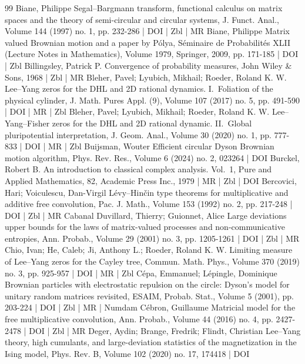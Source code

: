 \documentclass[10pt]{amsart}
\theoremstyle{definition}\newtheorem{defi}[theo]{Definition}\newtheorem{rema}[theo]{Remark}\newtheorem{exam}[theo]{Example}\newtheorem{exem}[theo]{Example}\newtheorem{nota}[theo]{Notation}
\begin{document}
\begin{thebibliography}{99}
Biane, Philippe Segal–Bargmann transform, functional calculus on matrix spaces and the theory of semi-circular and circular systems, J. Funct. Anal., Volume 144 (1997) no. 1, pp. 232-286 | DOI | Zbl | MR
Biane, Philippe Matrix valued Brownian motion and a paper by Pólya, Séminaire de Probabilités XLII (Lecture Notes in Mathematics), Volume 1979, Springer, 2009, pp. 171-185 | DOI | Zbl
Billingsley, Patrick P. Convergence of probability measures, John Wiley \& Sons, 1968 | Zbl | MR
Bleher, Pavel; Lyubich, Mikhail; Roeder, Roland K. W. Lee–Yang zeros for the DHL and 2D rational dynamics. I. Foliation of the physical cylinder, J. Math. Pures Appl. (9), Volume 107 (2017) no. 5, pp. 491-590 | DOI | MR | Zbl
Bleher, Pavel; Lyubich, Mikhail; Roeder, Roland K. W. Lee–Yang–Fisher zeros for the DHL and 2D rational dynamic. II. Global pluripotential interpretation, J. Geom. Anal., Volume 30 (2020) no. 1, pp. 777-833 | DOI | MR | Zbl
Buijsman, Wouter Efficient circular Dyson Brownian motion algorithm, Phys. Rev. Res., Volume 6 (2024) no. 2, 023264 | DOI
Burckel, Robert B. An introduction to classical complex analysis. Vol. 1, Pure and Applied Mathematics, 82, Academic Press Inc., 1979 | MR | Zbl | DOI
Bercovici, Hari; Voiculescu, Dan-Virgil Lévy–Hinčin type theorems for multiplicative and additive free convolution, Pac. J. Math., Volume 153 (1992) no. 2, pp. 217-248 | DOI | Zbl | MR
Cabanal Duvillard, Thierry; Guionnet, Alice Large deviations upper bounds for the laws of matrix-valued processes and non-communicative entropies, Ann. Probab., Volume 29 (2001) no. 3, pp. 1205-1261 | DOI | Zbl | MR
Chio, Ivan; He, Caleb; Ji, Anthony L.; Roeder, Roland K. W. Limiting measure of Lee–Yang zeros for the Cayley tree, Commun. Math. Phys., Volume 370 (2019) no. 3, pp. 925-957 | DOI | MR | Zbl
Cépa, Emmanuel; Lépingle, Dominique Brownian particles with electrostatic repulsion on the circle: Dyson’s model for unitary random matrices revisited, ESAIM, Probab. Stat., Volume 5 (2001), pp. 203-224 | DOI | Zbl | MR | Numdam
Cébron, Guillaume Matricial model for the free multiplicative convolution, Ann. Probab., Volume 44 (2016) no. 4, pp. 2427-2478 | DOI | Zbl | MR
Deger, Aydin; Brange, Fredrik; Flindt, Christian Lee–Yang theory, high cumulants, and large-deviation statistics of the magnetization in the Ising model, Phys. Rev. B, Volume 102 (2020) no. 17, 174418 | DOI

\end{thebibliography}
\end{document}
